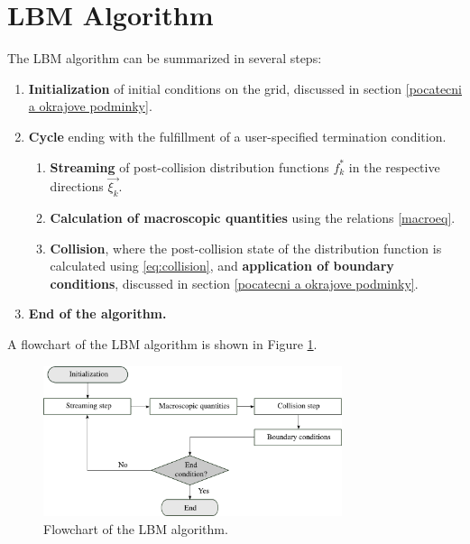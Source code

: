 \section{LBM Algorithm}\label{algoritmus LBM}
The LBM algorithm can be summarized in several steps:
\begin{enumerate}
	\item \textbf{Initialization} of initial conditions on the grid, discussed in section \ref{pocatecni a okrajove podminky}.
	\item \textbf{Cycle} ending with the fulfillment of a user-specified termination condition.
	\begin{enumerate}
		\item \textbf{Streaming} of post-collision distribution functions \( f^{*}_{k} \) in the respective directions \( \vec{\xi_{k}} \).
		\item \textbf{Calculation of macroscopic quantities} using the relations \eqref{macroeq}.
		\item \textbf{Collision}, where the post-collision state of the distribution function is calculated using \eqref{eq:collision}, and \textbf{application of boundary conditions}, discussed in section \ref{pocatecni a okrajove podminky}.
	\end{enumerate}
	\item \textbf{End of the algorithm.}
\end{enumerate}
A flowchart of the LBM algorithm is shown in Figure \ref{fig:algo}.
\begin{figure}[h]
	\centering
	\includegraphics[width=0.78\textwidth]{figures/algo-bw.pdf}
	\caption{Flowchart of the LBM algorithm.}
	\label{fig:algo}
\end{figure}